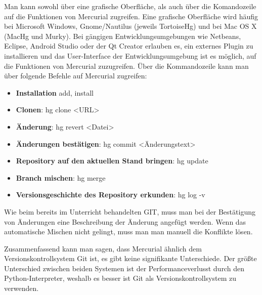 \documentclass[11pt]{article}
\begin{document}
Man kann sowohl über eine grafische Oberfläche, als auch über die Komandozeile auf die Funktionen von Mercurial zugreifen. Eine grafische Oberfläche wird häufig bei Microsoft Windows, Gnome/Nautilus (jeweils TortoiseHg) und bei Mac OS X (MacHg und Murky). Bei gängigen Entwicklungsumgebungen wie Netbeans, Eclipse, Android Studio oder der Qt Creator erlauben es, ein externes Plugin zu installieren und das User-Interface der Entwicklungsumgebung ist es möglich, auf die Funktionen von Mercurial zuzugreifen.
\newline
Über die Kommandozeile kann man über folgende Befehle auf Mercurial zugreifen:
\begin{itemize}
\item\textbf{Installation} add, install
\item\textbf{Clonen}: hg clone <URL>
\item\textbf{Änderung}: hg revert <Datei>
\item\textbf{Änderungen bestätigen}: hg commit <Änderungstext>
\item\textbf{Repository auf den aktuellen Stand bringen}: hg update
\item\textbf{Branch mischen}: hg merge
\item\textbf{Versionsgeschichte des Repository erkunden}: hg log -v
\end{itemize}
Wie beim bereits im Unterricht behandelten GIT, muss man bei der Bestätigung von Änderungen eine Beschreibung der Änderung angefügt werden. Wenn das automatische Mischen nicht gelingt, muss man man manuell die Konflikte lösen.

Zusammenfassend kann man sagen, dass Mercurial ähnlich dem Versionskontrollsystem Git ist, es gibt keine signifikante Unterschiede. Der größte Unterschied zwischen beiden Systemen ist der Performanceverlusst durch den Python-Interpreter, weshalb es besser ist Git als Versionskontrollsystem zu verwenden.
\end{document}

